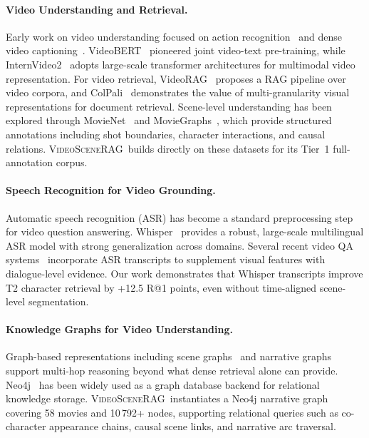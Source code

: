 \documentclass[11pt]{article}
\newcommand{\system}{\textsc{VideoSceneRAG}}
\begin{document}
\paragraph{Video Understanding and Retrieval.}
Early work on video understanding focused on action recognition~\cite{activitynet,two_stream}
and dense video captioning~\cite{dense_cap}.  VideoBERT~\cite{videobert}
pioneered joint video-text pre-training, while InternVideo2~\cite{internvideo2}
adopts large-scale transformer architectures for multimodal video
representation.  For video retrieval, VideoRAG~\cite{videorag} proposes a RAG
pipeline over video corpora, and ColPali~\cite{vidore} demonstrates the value
of multi-granularity visual representations for document retrieval.
Scene-level understanding has been explored through MovieNet~\cite{movienet}
and MovieGraphs~\cite{moviegraphs}, which provide structured annotations
including shot boundaries, character interactions, and causal relations.
\system\ builds directly on these datasets for its Tier~1 full-annotation
corpus.

\paragraph{Speech Recognition for Video Grounding.}
Automatic speech recognition (ASR) has become a standard preprocessing step
for video question answering.  Whisper~\cite{whisper} provides a robust,
large-scale multilingual ASR model with strong generalization across domains.
Several recent video QA systems~\cite{videorag,internvideo2} incorporate ASR
transcripts to supplement visual features with dialogue-level evidence.  Our
work demonstrates that Whisper transcripts improve T2 character retrieval by
+12.5 R@1 points, even without time-aligned scene-level segmentation.

\paragraph{Knowledge Graphs for Video Understanding.}
Graph-based representations including scene graphs~\cite{scene_graph} and
narrative graphs~\cite{moviegraphs} support multi-hop reasoning beyond what
dense retrieval alone can provide.  Neo4j~\cite{neo4j} has been widely used
as a graph database backend for relational knowledge storage.  \system\
instantiates a Neo4j narrative graph covering 58 movies and 10\,792+ nodes,
supporting relational queries such as co-character appearance chains, causal
scene links, and narrative arc traversal.
\end{document}
